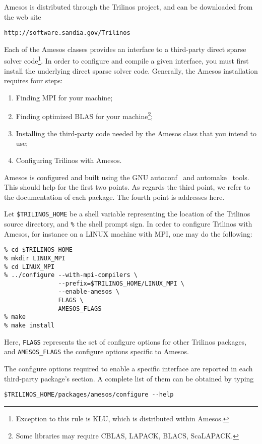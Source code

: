 \documentclass[11pt]{SANDreport}
\begin{document}
Amesos is distributed through the Trilinos project, and can be
downloaded from the web site
\begin{verbatim}
http://software.sandia.gov/Trilinos
\end{verbatim}

\smallskip

Each of the Amesos classes provides an interface to a third-party direct
sparse solver code\footnote{Exception to this rule is KLU, which is
  distributed within Amesos.}. In order to configure and compile a given
interface, you must first install the underlying direct sparse solver
code. Generally, the Amesos installation requires four steps:
\begin{enumerate}
\item Finding MPI for your machine;
\item Finding optimized BLAS for your machine\footnote{Some libraries
    may require CBLAS, LAPACK, BLACS, ScaLAPACK.};
\item Installing the third-party code needed by the Amesos class that
  you intend to use;
\item Configuring Trilinos with Amesos. 
\end{enumerate}

Amesos is configured and built using the GNU autoconf~\cite{Autoconf}
and automake~\cite{Automake} tools. This should help for the first two
points. As regards the third point, we refer to the documentation of
each package. The fourth point is addresses here.

Let \verb!$TRILINOS_HOME! be a shell variable representing the location
of the Trilinos source directory, and \verb!%! the shell prompt sign.  In order to configure Trilinos with
Amesos, for instance on a LINUX machine with MPI, one may do the
following:
\begin{verbatim}
% cd $TRILINOS_HOME
% mkdir LINUX_MPI
% cd LINUX_MPI
% ../configure --with-mpi-compilers \
               --prefix=$TRILINOS_HOME/LINUX_MPI \
               --enable-amesos \
               FLAGS \
               AMESOS_FLAGS
% make
% make install
\end{verbatim}
Here, \verb!FLAGS! represents the set of configure options for other
Trilinos packages, and \verb!AMESOS_FLAGS! the configure options
specific to Amesos. 

The configure options required to enable a specific interface are
reported in each third-party package's section. A complete list of them can
be obtained by typing
\begin{verbatim}
$TRILINOS_HOME/packages/amesos/configure --help
\end{verbatim}
\end{document}
